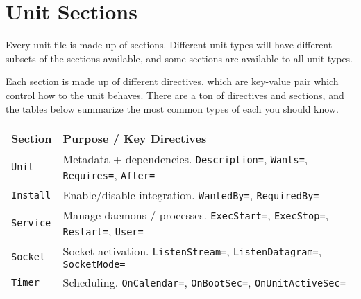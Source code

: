 \documentclass[openany, 12pt]{book}
\begin{document}
\chapter{Unit Sections}
Every unit file is made up of sections. Different unit types will have different
subsets of the sections available, and some sections are available to all unit
types.

Each section is made up of different directives, which are key-value pair which
control how to the unit behaves. There are a ton of directives and sections, and
the tables below summarize the most common types of each you should know.

\begin{center}
  \begin{tabular}{ll}
    \toprule
    \textbf{Section} & \textbf{Purpose / Key Directives}                                                                      \\
    \midrule
    \texttt{Unit}    & Metadata + dependencies. \texttt{Description=}, \texttt{Wants=}, \texttt{Requires=}, \texttt{After=}   \\
    \texttt{Install} & Enable/disable integration. \texttt{WantedBy=}, \texttt{RequiredBy=}                                   \\
    \texttt{Service} & Manage daemons / processes. \texttt{ExecStart=}, \texttt{ExecStop=}, \texttt{Restart=}, \texttt{User=} \\
    \texttt{Socket}  & Socket activation. \texttt{ListenStream=}, \texttt{ListenDatagram=}, \texttt{SocketMode=}              \\
    \texttt{Timer}   & Scheduling. \texttt{OnCalendar=}, \texttt{OnBootSec=}, \texttt{OnUnitActiveSec=}                       \\
    \bottomrule
  \end{tabular}
\end{center}
\end{document}
